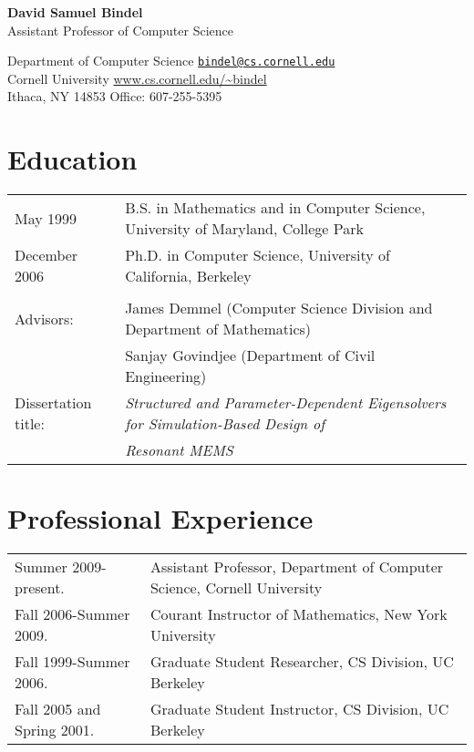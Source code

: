\documentclass{article}
\begin{document}
\begin{center}
  {\Large \bf David Samuel Bindel} \\
  Assistant Professor of Computer Science
\end{center}

\begin{trivlist}
\item
Department of Computer Science
  \hfill \href{mail:bindel@cs.cornell.edu}{\tt bindel@cs.cornell.edu} \\
Cornell University
  \hfill \url{www.cs.cornell.edu/~bindel} \\
Ithaca, NY 14853
  \hfill Office: 607-255-5395
\end{trivlist}


\section*{Education}

\begin{tabular}{ll}
May 1999 &
  B.S. in Mathematics and in Computer Science,
  University of Maryland, College Park \\
December 2006 &
  Ph.D. in Computer Science, University of California, Berkeley
\\
\\
Advisors:
 & James Demmel (Computer Science Division and Department of Mathematics) \\
 & Sanjay Govindjee (Department of Civil Engineering) \\
Dissertation title: &
   {\em Structured and Parameter-Dependent Eigensolvers for
        Simulation-Based Design of} \\
&  {\em Resonant MEMS}
\end{tabular}


\section*{Professional Experience}

\begin{tabular}{ll}
  Summer 2009-present.
    & Assistant Professor, Department of Computer Science,
      Cornell University \\
  Fall 2006-Summer 2009.
    & Courant Instructor of Mathematics, New York University \\
  Fall 1999-Summer 2006.
    & Graduate Student Researcher, CS Division, UC Berkeley \\
  Fall 2005 and Spring 2001.
    & Graduate Student Instructor, CS Division, UC Berkeley
\end{tabular}
\end{document}
